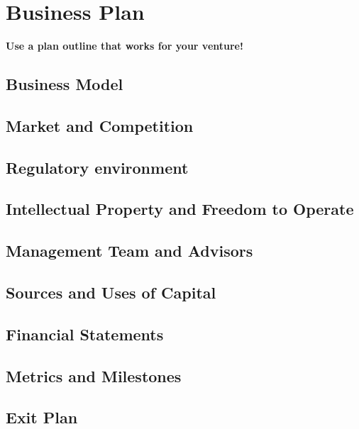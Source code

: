 
\chapter{Business Plan}

{\bf Use a plan outline that works for your venture!}

\section{Business Model}

\section{Market and Competition}

\section{Regulatory environment}

\section{Intellectual Property and Freedom to Operate}

\section{Management Team and Advisors}

\section{Sources and Uses of Capital}

\section{Financial Statements}

\section{Metrics and Milestones}

\section{Exit Plan}

